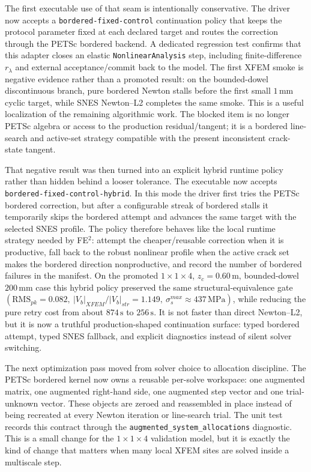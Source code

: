 The first executable use of that seam is intentionally conservative.  The
driver now accepts a \texttt{bordered-fixed-control} continuation policy that
keeps the protocol parameter fixed at each declared target and routes the
correction through the PETSc bordered backend.  A dedicated regression test
confirms that this adapter closes an elastic \texttt{NonlinearAnalysis} step,
including finite-difference \(r_\lambda\) and external acceptance/commit back
to the model.  The first XFEM smoke is negative evidence rather than a promoted
result: on the bounded-dowel discontinuous branch, pure bordered Newton stalls
before the first small \(1\,\mathrm{mm}\) cyclic target, while SNES Newton--L2
completes the same smoke.  This is a useful localization of the remaining
algorithmic work.  The blocked item is no longer PETSc algebra or access to
the production residual/tangent; it is a bordered line-search and active-set
strategy compatible with the present inconsistent crack-state tangent.

That negative result was then turned into an explicit hybrid runtime policy
rather than hidden behind a looser tolerance.  The executable now accepts
\texttt{bordered-fixed-control-hybrid}.  In this mode the driver first tries
the PETSc bordered correction, but after a configurable streak of bordered
stalls it temporarily skips the bordered attempt and advances the same target
with the selected SNES profile.  The policy therefore behaves like the local
runtime strategy needed by FE\(^2\): attempt the cheaper/reusable correction
when it is productive, fall back to the robust nonlinear profile when the
active crack set makes the bordered direction nonproductive, and record the
number of bordered failures in the manifest.  On the promoted
\(1\times1\times4\), \(z_c=0.60\,\mathrm{m}\), bounded-dowel \(200\,\mathrm{mm}\)
case this hybrid policy preserved the same structural-equivalence gate
\((\mathrm{RMS}_{pk}=0.082,\ |V_b|_{XFEM}/|V_b|_{str}=1.149,\ \sigma_s^{max}
\approx437\,\mathrm{MPa})\), while reducing the pure retry cost from about
\(874\,\mathrm{s}\) to \(256\,\mathrm{s}\).  It is not faster than direct
Newton--L2, but it is now a truthful production-shaped continuation surface:
typed bordered attempt, typed SNES fallback, and explicit diagnostics instead
of silent solver switching.

The next optimization pass moved from solver choice to allocation discipline.
The PETSc bordered kernel now owns a reusable per-solve workspace: one
augmented matrix, one augmented right-hand side, one augmented step vector and
one trial-unknown vector.  These objects are zeroed and reassembled in place
instead of being recreated at every Newton iteration or line-search trial.  The
unit test records this contract through the
\texttt{augmented\_system\_allocations} diagnostic.  This is a small change for
the \(1\times1\times4\) validation model, but it is exactly the kind of change
that matters when many local XFEM sites are solved inside a multiscale step.

